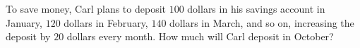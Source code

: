 To save money, Carl plans to deposit $100$ dollars in his savings account in January, $120$ dollars in February, $140$ dollars in March, and so on, increasing the deposit by $20$ dollars every month. How much will Carl deposit in October?
